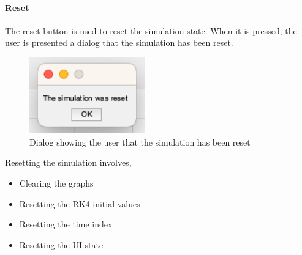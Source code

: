 \paragraph{Reset} The reset button is used to reset the simulation state. When it is pressed, the user is presented a dialog that the simulation has been reset. 
\begin{figure}[H]
     \centering
     \includegraphics[width=5cm]{graphics/visualisation/dialog_reset}
     \caption{Dialog showing the user that the simulation has been reset}
\end{figure}
Resetting the simulation involves,
\begin{itemize}
	\item Clearing the graphs
	\item Resetting the RK4 initial values
	\item Resetting the time index
	\item Resetting the UI state
\end{itemize}

